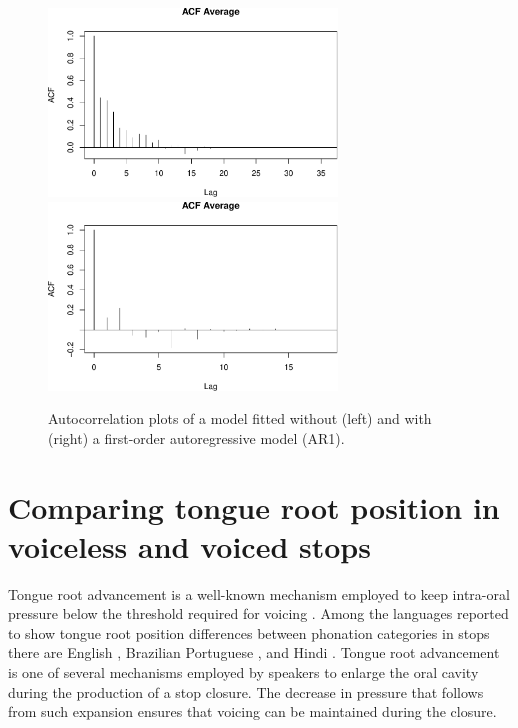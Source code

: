 \documentclass[12pt,]{article}
\begin{document}
\begin{figure}

{\centering \includegraphics[width=.7\linewidth,height=5cm]{2018-polar-gam_files/figure-latex/it01-acf-1} \includegraphics[width=.7\linewidth,height=5cm]{2018-polar-gam_files/figure-latex/it01-acf-2} 

}

\caption{Autocorrelation plots of a model fitted without (left) and with (right) a first-order autoregressive model (AR1).}\label{f:it01-acf}
\end{figure}

\hypertarget{comparing-tongue-root-position-in-voiceless-and-voiced-stops}{%
\section{Comparing tongue root position in voiceless and voiced
stops}\label{comparing-tongue-root-position-in-voiceless-and-voiced-stops}}

Tongue root advancement is a well-known mechanism employed to keep
intra-oral pressure below the threshold required for voicing
\citep{ohala2011, kent1969, perkell1969, westbury1983, ahn2018}. Among
the languages reported to show tongue root position differences between
phonation categories in stops there are English
\citep{westbury1983, ahn2018}, Brazilian Portuguese \citep{ahn2018}, and
Hindi \citet{ahn2016a}. Tongue root advancement is one of several
mechanisms employed by speakers to enlarge the oral cavity during the
production of a stop closure. The decrease in pressure that follows from
such expansion ensures that voicing can be maintained during the
closure.
\end{document}
